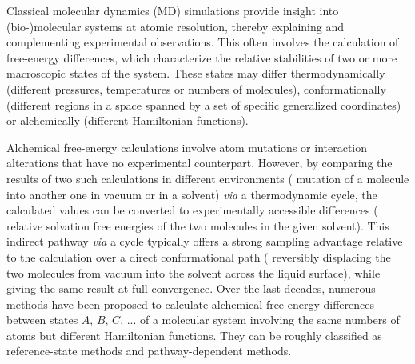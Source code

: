 Classical molecular dynamics (MD) simulations provide insight into (bio-)molecular systems at atomic resolution, thereby explaining and complementing experimental observations. This often involves the calculation of free-energy differences\cite{CH10.1,CH11.8,HA14.1}, which characterize the relative stabilities of two or more macroscopic states of the system. These states may differ thermodynamically (different pressures, temperatures or numbers of molecules), conformationally (different regions in a space spanned by a set of specific generalized coordinates) or alchemically (different Hamiltonian functions). 

Alchemical free-energy calculations involve atom mutations or interaction alterations that have no experimental counterpart. However, by comparing the results of two such calculations in different environments (\eg{} mutation of a molecule into another one in vacuum or in a solvent) \textit{via} a thermodynamic cycle\cite{VA87.4,JO88.3}, the calculated values can be converted to experimentally accessible differences (\eg{} relative solvation free energies of the two molecules in the given solvent). This indirect pathway \textit{via} a cycle typically offers a strong sampling advantage relative to the calculation over a direct conformational path (\eg{} reversibly displacing the two molecules from vacuum into the solvent across the liquid surface), while giving the same result at full convergence\cite{CO14.1,MA17.14,BA18.2}. Over the last decades, numerous methods have been proposed to calculate alchemical free-energy differences between states $A$, $B$, $C$, ... of a molecular system involving the same numbers of atoms but different Hamiltonian functions. They can be roughly classified as reference-state methods and pathway-dependent methods\cite{SH07.13}.

